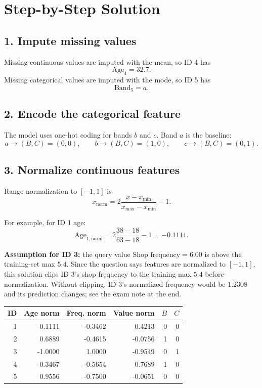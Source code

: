 \documentclass[11pt]{article}
\begin{document}
\section*{Step-by-Step Solution}

\subsection*{1. Impute missing values}

Missing continuous values are imputed with the mean, so ID 4 has
\[
    \text{Age}_{4}=32.7.
\]
Missing categorical values are imputed with the mode, so ID 5 has
\[
    \text{Band}_{5}=a.
\]

\subsection*{2. Encode the categorical feature}

The model uses one-hot coding for bands \(b\) and \(c\). Band \(a\) is the baseline:
\[
    a \rightarrow (B,C)=(0,0),\qquad
    b \rightarrow (B,C)=(1,0),\qquad
    c \rightarrow (B,C)=(0,1).
\]

\subsection*{3. Normalize continuous features}

Range normalization to \([-1,1]\) is
\[
    x_{\text{norm}}
    =
    2\frac{x-x_{\min}}{x_{\max}-x_{\min}}-1.
\]

For example, for ID 1 age:
\[
    \text{Age}_{1,\text{norm}}
    =
    2\frac{38-18}{63-18}-1
    =
    -0.1111.
\]

\textbf{Assumption for ID 3:} the query value \(\text{Shop frequency}=6.00\)
is above the training-set max \(5.4\). Since the question says features are
normalized to \([-1,1]\), this solution clips ID 3's shop frequency to the
training max \(5.4\) before normalization. Without clipping, ID 3's normalized
frequency would be \(1.2308\) and its prediction changes; see the exam note at
the end.

\begin{center}
\begin{tabular}{rrrrrr}
\toprule
ID & Age norm & Freq. norm & Value norm & \(B\) & \(C\) \\
\midrule
1 & -0.1111 & -0.3462 & 0.4213 & 0 & 0 \\
2 & 0.6889 & -0.4615 & -0.0756 & 1 & 0 \\
3 & -1.0000 & 1.0000 & -0.9549 & 0 & 1 \\
4 & -0.3467 & -0.5654 & 0.7689 & 1 & 0 \\
5 & 0.9556 & -0.7500 & -0.0651 & 0 & 0 \\
\bottomrule
\end{tabular}
\end{center}
\end{document}
